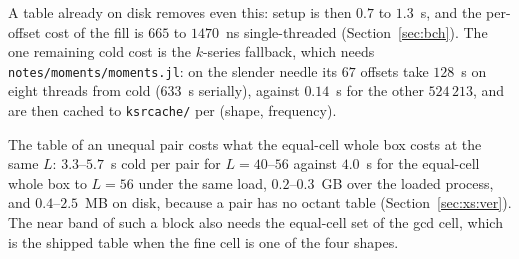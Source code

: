 \documentclass[11pt]{article}
\theoremstyle{remark}
\newcommand{\code}[1]{\texttt{#1}}
\begin{document}
A table already on disk removes even this: setup is then $0.7$ to $1.3$~s, and the
per-offset cost of the fill is $665$ to $1470$~ns single-threaded (Section~\ref{sec:bch}).
The one remaining cold cost is the $k$-series fallback, which needs
\code{notes/moments/moments.jl}: on the slender needle its $67$ offsets take $128$~s on
eight threads from cold ($633$~s serially), against $0.14$~s for the other $524\,213$, and
are then cached to \code{ksrcache/} per (shape, frequency).

The table of an unequal pair costs what the equal-cell whole box costs at the same $L$:
$3.3$--$5.7$~s cold per pair for $L = 40$--$56$ against $4.0$~s for the equal-cell whole
box to $L = 56$ under the same load, $0.2$--$0.3$~GB over the loaded process, and
$0.4$--$2.5$~MB on disk, because a pair has no octant table
(Section~\ref{sec:xs:ver}). The near band of such a block also needs the equal-cell set of
the gcd cell, which is the shipped table when the fine cell is one of the four shapes.




























\end{document}

